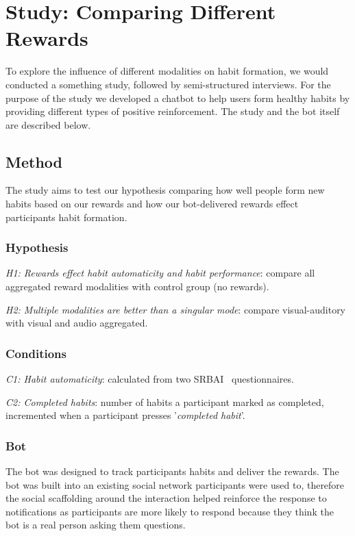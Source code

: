\documentclass{scaffold/sigchi}
\begin{document}
\section{Study: Comparing Different Rewards}
To explore the influence of different modalities on habit formation, we would conducted a something study, followed by semi-structured interviews. For the purpose of the study we developed a chatbot to help users form healthy habits by providing different types of positive reinforcement. The study and the bot itself are described below.

\subsection{Method}
The study aims to test our hypothesis comparing how well people form new habits based on our rewards and how our bot-delivered rewards effect participants habit formation.

\subsubsection{Hypothesis}
\textit{H1: Rewards effect habit automaticity and habit performance}: compare all aggregated reward modalities with control group (no rewards).

\textit{H2: Multiple modalities are better than a singular mode}: compare visual-auditory with visual and audio aggregated.

\subsubsection{Conditions}
\textit{C1: Habit automaticity}: calculated from two SRBAI~\cite{article_4q_SRBAI} questionnaires.

\textit{C2: Completed habits}: number of habits a participant marked as completed, incremented when a participant presses '\textit{completed habit}'.

\subsubsection{Bot}
The bot was designed to track participants habits and deliver the rewards. The bot was built into an existing social network participants were used to, therefore the social scaffolding around the interaction helped reinforce the response to notifications as participants are more likely to respond because they think the bot is a real person asking them questions.
\end{document}
